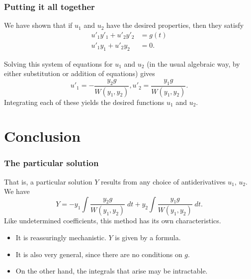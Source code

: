 \begin{frame}

\frametitle{Putting it all together}
\label{puttingitalltogether}

We have shown that if $ u_1 $ and $ u_2 $ have the desired properties, then they satisfy
 \begin{align*}
    u'_1 y'_1 + u'_2 y'_2 &= g(t) \\
    u'_1 y_1 + u'_2 y_2  &= 0.
\end{align*}
 
Solving this system of equations for $ u_1 $ and $ u_2 $ (in the usual algebraic way, by either substitution or addition of equations)
gives
\[
    u'_1 = -\frac{y_2 g}{W(y_1, y_2)}, u'_2 = \frac{y_1 g}{W(y_1, y_2)}.
\]
Integrating each of these yields the desired functions $ u_1 $ and $ u_2 $.

\end{frame}

\section{Conclusion}
\label{conclusion}

\begin{frame}

\frametitle{The particular solution}
\label{theparticularsolution}

That is, a particular solution $ Y $ results from any choice of antiderivatives $ u_1 $, $ u_2 $. We have
\[
    Y = -y_1 \int \frac{y_2 g}{W(y_1, y_2)} \; dt + y_2 \int \frac{y_1 g}{W(y_1, y_2)} \; dt.
\]
Like undetermined coefficients, this method has its own characteristics.

\begin{itemize}
\item It is reassuringly mechanistic. $ Y $ is given by a formula.

\item It is also very general, since there are no conditions on $ g $.

\item On the other hand, the integrals that arise may be intractable.

\end{itemize}

\end{frame}

